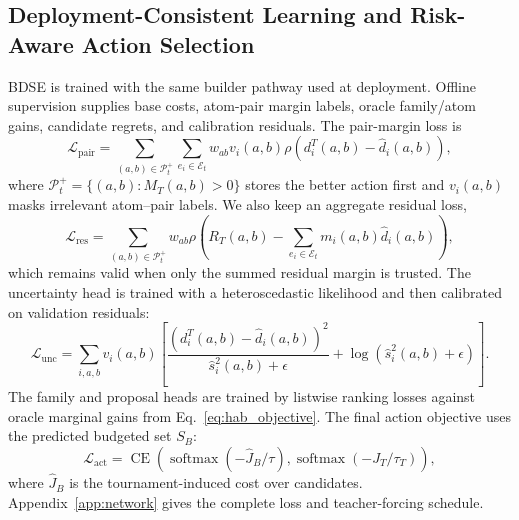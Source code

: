 \documentclass{article}
\newcommand{\E}{\mathcal{E}}
\begin{document}
\subsection{Deployment-Consistent Learning and Risk-Aware Action Selection}
\label{sec:learning_action}

BDSE is trained with the same builder pathway used at deployment. Offline supervision supplies base costs, atom-pair margin labels, oracle family/atom gains, candidate regrets, and calibration residuals. The pair-margin loss is
\begin{equation}
    \mathcal L_{\mathrm{pair}}=
    \sum_{(a,b)\in\mathcal P_t^+}\sum_{e_i\in\E_t}
    w_{ab}v_i(a,b)
    \rho\!\left(d_i^T(a,b)-\hat d_i(a,b)\right),
    \label{eq:pair_atom_loss}
\end{equation}
where $\mathcal P_t^+=\{(a,b):M_T(a,b)>0\}$ stores the better action first and $v_i(a,b)$ masks irrelevant atom--pair labels. We also keep an aggregate residual loss,
\begin{equation}
    \mathcal L_{\mathrm{res}}=
    \sum_{(a,b)\in\mathcal P_t^+}w_{ab}
    \rho\!\left(
    R_T(a,b)-\sum_{e_i\in\E_t}m_i(a,b)\hat d_i(a,b)
    \right),
    \label{eq:res_loss}
\end{equation}
which remains valid when only the summed residual margin is trusted. The uncertainty head is trained with a heteroscedastic likelihood and then calibrated on validation residuals:
\begin{equation}
    \mathcal L_{\mathrm{unc}}=
    \sum_{i,a,b}v_i(a,b)
    \left[\frac{(d_i^T(a,b)-\hat d_i(a,b))^2}{\hat s_i^2(a,b)+\epsilon}
    +\log(\hat s_i^2(a,b)+\epsilon)\right].
    \label{eq:unc_loss}
\end{equation}
The family and proposal heads are trained by listwise ranking losses against oracle marginal gains from Eq.~\eqref{eq:hab_objective}. The final action objective uses the predicted budgeted set $S_B$:
\begin{equation}
    \mathcal L_{\mathrm{act}}=
    \operatorname{CE}\!\left(
    \operatorname{softmax}(-\hat J_B/\tau),
    \operatorname{softmax}(-J_T/\tau_T)
    \right),
    \label{eq:act_loss}
\end{equation}
where $\hat J_B$ is the tournament-induced cost over candidates. Appendix~\ref{app:network} gives the complete loss and teacher-forcing schedule.
\end{document}
